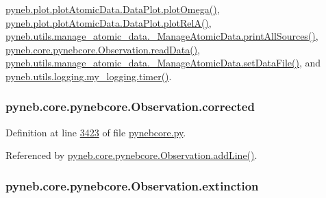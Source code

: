 \hyperlink{plot_atomic_data_8py_source_l00372}{pyneb.\+plot.\+plot\+Atomic\+Data.\+Data\+Plot.\+plot\+Omega()}, \hyperlink{plot_atomic_data_8py_source_l00261}{pyneb.\+plot.\+plot\+Atomic\+Data.\+Data\+Plot.\+plot\+Rel\+A()}, \hyperlink{manage__atomic__data_8py_source_l00431}{pyneb.\+utils.\+manage\+\_\+atomic\+\_\+data.\+\_\+\+Manage\+Atomic\+Data.\+print\+All\+Sources()}, \hyperlink{pynebcore_8py_source_l03589}{pyneb.\+core.\+pynebcore.\+Observation.\+read\+Data()}, \hyperlink{manage__atomic__data_8py_source_l00380}{pyneb.\+utils.\+manage\+\_\+atomic\+\_\+data.\+\_\+\+Manage\+Atomic\+Data.\+set\+Data\+File()}, and \hyperlink{logging_8py_source_l00115}{pyneb.\+utils.\+logging.\+my\+\_\+logging.\+timer()}.

\hypertarget{classpyneb_1_1core_1_1pynebcore_1_1_observation_a7eef3176d082009fa850a9d364d44625}{}
\subsubsection[{corrected}]{\setlength{\rightskip}{0pt plus 5cm}pyneb.\+core.\+pynebcore.\+Observation.\+corrected}\label{classpyneb_1_1core_1_1pynebcore_1_1_observation_a7eef3176d082009fa850a9d364d44625}


Definition at line \hyperlink{pynebcore_8py_source_l03423}{3423} of file \hyperlink{pynebcore_8py_source}{pynebcore.\+py}.



Referenced by \hyperlink{pynebcore_8py_source_l03436}{pyneb.\+core.\+pynebcore.\+Observation.\+add\+Line()}.

\hypertarget{classpyneb_1_1core_1_1pynebcore_1_1_observation_acdd6227c32bd92ec4a15b83110bcb570}{}
\subsubsection[{extinction}]{\setlength{\rightskip}{0pt plus 5cm}pyneb.\+core.\+pynebcore.\+Observation.\+extinction}\label{classpyneb_1_1core_1_1pynebcore_1_1_observation_acdd6227c32bd92ec4a15b83110bcb570}


